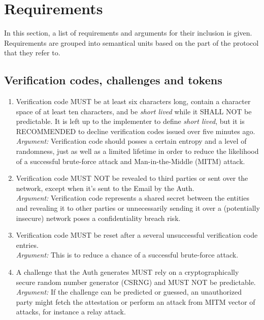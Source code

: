 \section{Requirements}
In this section, a list of requirements and arguments for their inclusion is given. Requirements are grouped into 
semantical units based on the part of the protocol that they refer to.

    \subsection{Verification codes, challenges and tokens}
        \begin{enumerate}
            \item Verification code MUST be at least six characters long, contain a character space of at 
                  least ten characters, and be \textit{short lived} while it SHALL NOT be predictable. It is 
                  left up to the implementer to define \textit{short lived}, but it is RECOMMENDED to decline 
                  verification codes issued over five minutes ago.\\    
            \textit{Argument:} Verification code should posses a certain entropy and a level of randomness, 
                               just as well as a limited lifetime in order to reduce  the likelihood of a 
                               successful brute-force attack and Man-in-the-Middle (MITM) attack.

            \item Verification code MUST NOT be revealed to third parties or sent over the network, 
                  except when it's sent to the Email by the Auth.\\        
            \textit{Argument:} Verification code represents a shared secret between the entities and revealing 
                               it to other parties or unnecessarily sending it over a (potentially insecure) 
                               network poses a confidentiality breach risk.

            \item Verification code MUST be reset after a several unsuccessful verification code entries.\\        
            \textit{Argument:} This is to reduce a chance of a successful brute-force attack.

            \item A challenge that the Auth generates MUST rely on a cryptographically secure random number 
                  generator (CSRNG) and MUST NOT be predictable.\\
            \textit{Argument:} If the challenge can be predicted or guessed, an unauthorized party might fetch the
                               attestation or perform an attack from MITM vector of attacks, for instance a relay 
                               attack.


\end{enumerate}
